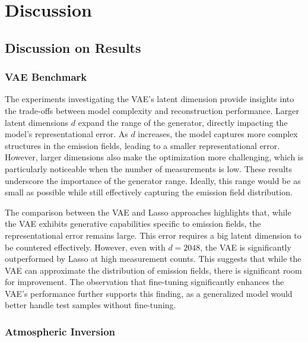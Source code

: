 
\chapter{Discussion}\label{chapter:discussion}

\section{Discussion on Results}

\subsection{VAE Benchmark}

The experiments investigating the \gls{VAE}'s latent dimension provide insights into the trade-offs between model complexity and reconstruction performance.
Larger latent dimensions $d$ expand the range of the generator, directly impacting the model's representational error.
As $d$ increases, the model captures more complex structures in the emission fields, leading to a smaller representational error.
However, larger dimensions also make the optimization more challenging, which is particularly noticeable when the number of measurements is low. 
These results underscore the importance of the generator range.
Ideally, this range would be as small as possible while still effectively capturing the emission field distribution.

The comparison between the \gls{VAE} and \gls{Lasso} approaches highlights that, while the \gls{VAE} exhibits generative capabilities specific to emission fields, the representational error remains large.
This error requires a big latent dimension to be countered effectively.
However, even with $d = 2048$, the \gls{VAE} is significantly outperformed by \gls{Lasso} at high measurement counts.
This suggests that while the \gls{VAE} can approximate the distribution of emission fields, there is significant room for improvement.
The observation that fine-tuning significantly enhances the \gls{VAE}'s performance further supports this finding, as a generalized model would better handle test samples without fine-tuning.

\subsection{Atmospheric Inversion}

